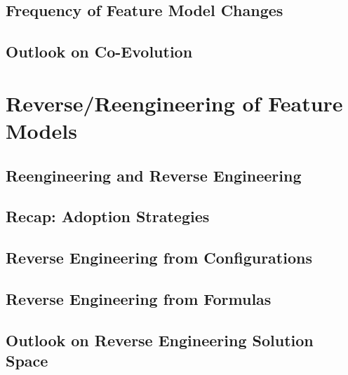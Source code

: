 \subsection{Frequency of Feature Model Changes}
\subsection{Outlook on Co-Evolution}
\lessonslearned{
	\item \ldots
}{
	\item \ldots
}{
	\ldots
}

\section{Reverse/Reengineering of Feature Models}
\subsection{Reengineering and Reverse Engineering}
\subsection{Recap: Adoption Strategies}
\subsection{Reverse Engineering from Configurations}
\subsection{Reverse Engineering from Formulas}
\subsection{Outlook on Reverse Engineering Solution Space}
\lessonslearned{
	\item \ldots
}{
	\item \ldots
}{
	\ldots
}

